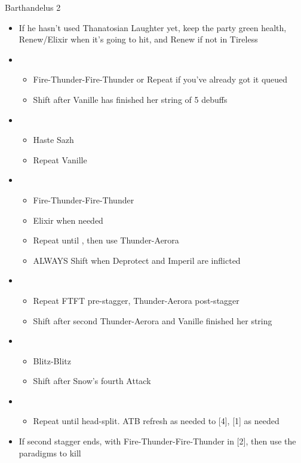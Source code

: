 \begin{paracol}{2}
\begin{battle}{Barthandelus 2}
\begin{itemize}
			\item If he hasn't used Thanatosian Laughter yet, keep the party green health, Renew/Elixir when it's going to hit, and Renew if not in Tireless
			\item \third
			      \begin{itemize}
				      \item Fire-Thunder-Fire-Thunder or Repeat if you've already got it queued
				      \item Shift after Vanille has finished her string of 5 debuffs
			      \end{itemize}
			\item \fifth
			      \begin{itemize}
				      \item Haste Sazh
				      \item Repeat Vanille
			      \end{itemize}
			\item \third
			      \begin{itemize}
				      \item Fire-Thunder-Fire-Thunder
				      \item Elixir when needed
				      \item Repeat until \stagger, then use Thunder-Aerora
				      \item ALWAYS Shift when Deprotect and Imperil are inflicted
			      \end{itemize}
			\item \second
			      \begin{itemize}
				      \item Repeat FTFT pre-stagger, Thunder-Aerora post-stagger
				      \item Shift after second Thunder-Aerora and Vanille finished her string
			      \end{itemize}
			\item \first
			      \begin{itemize}
				      \item Blitz-Blitz
				      \item Shift after Snow's fourth Attack
			      \end{itemize}
			\item \sixth
			      \begin{itemize}
				      \item Repeat until head-split. ATB refresh as needed to [4], [1] as needed
			      \end{itemize}
			\item If second stagger ends, \stagger with Fire-Thunder-Fire-Thunder in [2], then use the \com paradigms to kill
		\end{itemize}
	\end{battle}
	\switchcolumn*
	\switchcolumn
\end{paracol}